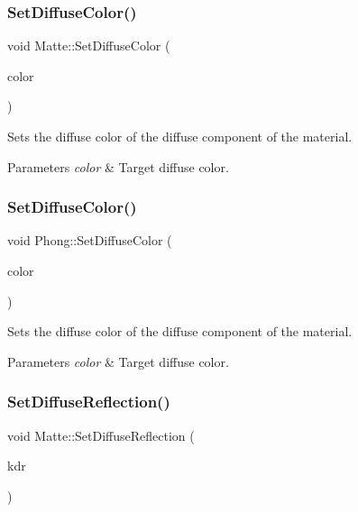 \subsubsection{\texorpdfstring{Set\+Diffuse\+Color()}{SetDiffuseColor()}\hspace{0.1cm}{\footnotesize\ttfamily [1/2]}}
{\footnotesize\ttfamily void Matte\+::\+Set\+Diffuse\+Color (\begin{DoxyParamCaption}\item[{const \hyperlink{class_r_g_b_color}{R\+G\+B\+Color} \&}]{color }\end{DoxyParamCaption})\hspace{0.3cm}{\ttfamily [inline]}}

Sets the diffuse color of the diffuse component of the material. 
\begin{DoxyParams}{Parameters}
{\em color} & Target diffuse color. \\
\hline
\end{DoxyParams}
\hypertarget{group___materials_ga54c0c1a1b40732588660aebbe01ce94f}{}\label{group___materials_ga54c0c1a1b40732588660aebbe01ce94f} 
\subsubsection{\texorpdfstring{Set\+Diffuse\+Color()}{SetDiffuseColor()}\hspace{0.1cm}{\footnotesize\ttfamily [2/2]}}
{\footnotesize\ttfamily void Phong\+::\+Set\+Diffuse\+Color (\begin{DoxyParamCaption}\item[{const \hyperlink{class_r_g_b_color}{R\+G\+B\+Color} \&}]{color }\end{DoxyParamCaption})\hspace{0.3cm}{\ttfamily [inline]}}

Sets the diffuse color of the diffuse component of the material. 
\begin{DoxyParams}{Parameters}
{\em color} & Target diffuse color. \\
\hline
\end{DoxyParams}
\hypertarget{group___materials_ga59c2ccdf9e80053784f5449603c7b7a3}{}\label{group___materials_ga59c2ccdf9e80053784f5449603c7b7a3} 
\subsubsection{\texorpdfstring{Set\+Diffuse\+Reflection()}{SetDiffuseReflection()}\hspace{0.1cm}{\footnotesize\ttfamily [1/2]}}
{\footnotesize\ttfamily void Matte\+::\+Set\+Diffuse\+Reflection (\begin{DoxyParamCaption}\item[{const float}]{kdr }\end{DoxyParamCaption})\hspace{0.3cm}{\ttfamily [inline]}}

